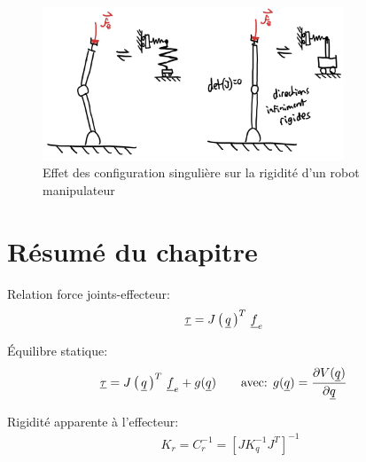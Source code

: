 \begin{figure}[htbp]
	\centering
		\includegraphics[width=0.80\textwidth]{fig/robotcompliance_singular.jpg}
	\caption{Effet des configuration singulière sur la rigidité d'un robot manipulateur}
	\label{fig:robotcompliance_singular}
\end{figure}

\newpage
\section{Résumé du chapitre}


Relation force joints-effecteur:
\begin{align}
\underline{\tau} &= J\left( \, \underline{q} \, \right)^T \, \underline{f}_e 
\end{align}

Équilibre statique:
\begin{align}
\underline{\tau} &= J\left( \, \underline{q} \, \right)^T \, \underline{f}_e +  g( \underline{q} )
\quad \quad \text{avec:  }
g( \underline{q} ) = 
\frac{ \partial V(\underline{q} ) }{\partial \underline{q} } 
\end{align}

Rigidité apparente à l'effecteur:
\begin{align}
K_r = C_r^{-1} = \left[ J K_q^{-1} J^T \right]^{-1}
\end{align}
